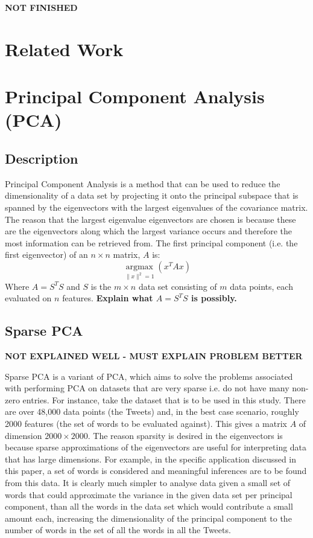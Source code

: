 \documentclass[11pt,a4paper]{article}
\begin{document}
\textbf{NOT FINISHED}

\section{Related Work}
\section{Principal Component Analysis (PCA)}
\subsection{Description}
Principal Component Analysis is a method that can be used to reduce the dimensionality of a data set by projecting it onto the principal subspace that is spanned by the eigenvectors with the largest eigenvalues of the covariance matrix. The reason that the largest eigenvalue eigenvectors are chosen is because these are the eigenvectors along which the largest variance occurs and therefore the most information can be retrieved from. The first principal component (i.e. the first eigenvector) of an $n\times n$ matrix, $A$ is:
\begin{equation}
\underset{\|x\|^2 = 1}{\operatorname{argmax}}\left( x^TAx\right)
\end{equation}
Where $A = S^TS$ and $S$ is the $m\times n$ data set consisting of $m$ data points, each evaluated on $n$ features. \textbf{Explain what $A = S^TS$ is possibly.}
\subsection{Sparse PCA}
\textbf{NOT EXPLAINED WELL - MUST EXPLAIN PROBLEM BETTER}

Sparse PCA is a variant of PCA, which aims to solve the problems associated with performing PCA on datasets that are very sparse i.e. do not have many non-zero entries. For instance, take the dataset that is to be used in this study. There are over 48,000 data points (the Tweets) and, in the best case scenario, roughly 2000 features (the set of words to be evaluated against). This gives a matrix $A$ of dimension $2000\times 2000$. The reason sparsity is desired in the eigenvectors is because sparse approximations of the eigenvectors are useful for interpreting data that has large dimensions. For example, in the specific application discussed in this paper, a set of words is considered and meaningful inferences are to be found from this data. It is clearly much simpler to analyse data given a small set of words that could approximate the variance in the given data set per principal component, than all the words in the data set which would contribute a small amount each, increasing the dimensionality of the principal component to the number of words in the set of all the words in all the Tweets.
\end{document}
